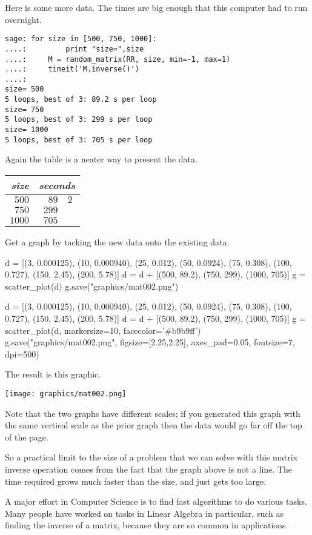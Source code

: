 Here is some more data.
The times are big enough that this computer had to run overnight.
\begin{lstlisting}
sage: for size in [500, 750, 1000]:                             
....:         print "size=",size
....:     M = random_matrix(RR, size, min=-1, max=1)
....:     timeit('M.inverse()')
....: 
size= 500
5 loops, best of 3: 89.2 s per loop
size= 750
5 loops, best of 3: 299 s per loop
size= 1000
5 loops, best of 3: 705 s per loop
\end{lstlisting}
Again the table is a neater way to present the data.
\begin{center}
  \begin{tabular}{r|r@{.}l}
    \textit{size}     &\multicolumn{2}{c}{\textit{seconds}}  \\  \hline
    $500$       &$89$ &$2$ \\
    $750$       &$299$ &   \\
    $1000$      &$705$ &   
  \end{tabular}
\end{center}
Get a graph by tacking the new data onto the existing data.
\begin{sageoutput}[d,0,3]
d = [(3, 0.000125), (10, 0.000940), (25, 0.012),  
     (50, 0.0924), (75, 0.308), (100, 0.727), 
     (150, 2.45), (200, 5.78)]
d = d + [(500, 89.2), (750, 299), (1000, 705)]
g = scatter_plot(d)                           
g.save("graphics/mat002.png")                      
\end{sageoutput}
\begin{sagesilent}
d = [(3, 0.000125), (10, 0.000940), (25, 0.012),  
     (50, 0.0924), (75, 0.308), (100, 0.727), 
     (150, 2.45), (200, 5.78)]
d = d + [(500, 89.2), (750, 299), (1000, 705)]
g = scatter_plot(d, markersize=10, facecolor='#b9b9ff')
g.save("graphics/mat002.png", figsize=[2.25,2.25], axes_pad=0.05, fontsize=7, dpi=500)              
\end{sagesilent}
The result is this graphic.
\begin{center}
  \texttt{[image: graphics/mat002.png]}
\end{center}
Note that the two graphs have different scales;
if you generated this graph with the same vertical scale as the prior graph
then the data would go far off the top of the page.

So a practical limit to the size of a problem that we can solve with
this matrix inverse operation comes from the fact that the graph above is
not a line.
The time required grows much faster than the size, and just gets too large. 

A major effort in Computer Science is to find fast algorithms to 
do various tasks.
Many people have worked on tasks in Linear Algebra in particular,
such as finding the inverse of a matrix, because
they are so common in applications.

\endinput


TODO:
